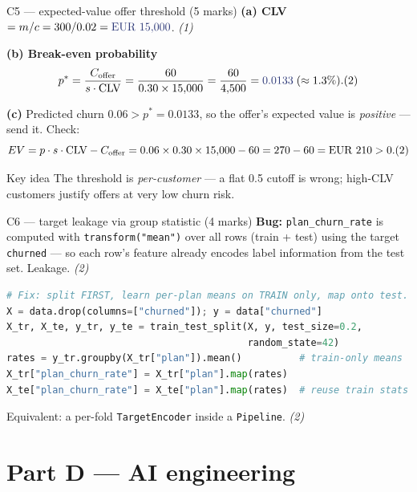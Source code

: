 \documentclass[aspectratio=169,11pt]{beamer}
\begin{document}
\begin{frame}{C5 --- expected-value offer threshold (5 marks)}
\textbf{(a) CLV} $= m / c = 300 / 0.02 = \textcolor{hsbiblue}{\text{EUR }15{,}000}$. \hfill \emph{(1)}

\textbf{(b) Break-even probability}
\[
p^{*} = \frac{C_{\text{offer}}}{s \cdot \text{CLV}}
      = \frac{60}{0.30 \times 15{,}000}
      = \frac{60}{4{,}500}
      = \textcolor{hsbiblue}{0.0133}\;(\approx 1.3\%). \hfill (2)
\]

\textbf{(c)} Predicted churn $0.06 > p^{*}=0.0133$, so the offer's expected value is
\emph{positive} --- \textcolor{cgreen}{send it}. Check:
\[
EV = p \cdot s \cdot \text{CLV} - C_{\text{offer}}
   = 0.06 \times 0.30 \times 15{,}000 - 60 = 270 - 60 = \text{EUR }210 > 0. \hfill (2)
\]
\begin{block}{Key idea}
\footnotesize The threshold is \emph{per-customer} --- a flat 0.5 cutoff is wrong; high-CLV customers justify offers at very low churn risk.
\end{block}
\end{frame}

\begin{frame}[fragile]{C6 --- target leakage via group statistic (4 marks)}
\textbf{Bug:} \texttt{plan\_churn\_rate} is computed with \texttt{transform("mean")} over
\textcolor{cred}{all rows (train + test) using the target \texttt{churned}} --- so each row's
feature already encodes label information from the test set. Leakage. \hfill \emph{(2)}
\begin{lstlisting}[language=Python]
# Fix: split FIRST, learn per-plan means on TRAIN only, map onto test.
X = data.drop(columns=["churned"]); y = data["churned"]
X_tr, X_te, y_tr, y_te = train_test_split(X, y, test_size=0.2,
                                          random_state=42)
rates = y_tr.groupby(X_tr["plan"]).mean()          # train-only means
X_tr["plan_churn_rate"] = X_tr["plan"].map(rates)
X_te["plan_churn_rate"] = X_te["plan"].map(rates)  # reuse train stats
\end{lstlisting}
\footnotesize Equivalent: a per-fold \texttt{TargetEncoder} inside a \texttt{Pipeline}. \hfill \emph{(2)}
\end{frame}

\section{Part D --- AI engineering}
\end{document}
